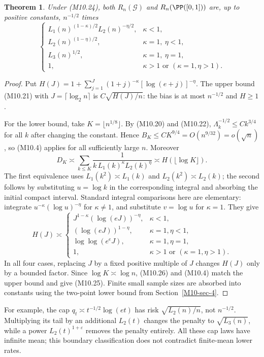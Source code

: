 \documentclass[11pt,a4paper]{article}
\newtheorem{theorem}{Theorem}[section]
\theoremstyle{definition}\newtheorem{definition}[theorem]{Definition}
\theoremstyle{remark}\newtheorem{remark}[theorem]{Remark}
\numberwithin{equation}{section}
\begin{document}
\begin{theorem}\label{M10-th:logs}
Under (M10.24), both $R_n(\mathcal G)$ and $R_n(\PP([0,1]))$ are, up to positive constants, $n^{-1/2}$ times
\[
 \begin{cases}
 L_1(n)^{(1-\kappa)/2}L_2(n)^{-\eta/2},&\kappa<1,\\
 L_2(n)^{(1-\eta)/2},&\kappa=1,\ \eta<1,\\
 L_3(n)^{1/2},&\kappa=1,\ \eta=1,\\
 1,&\kappa>1\text{ or }(\kappa=1,\eta>1).
 \end{cases}\tag{M10.25}
\]
\end{theorem}
\begin{proof}
Put $H(J)=1+\sum_{j=1}^J(1+j)^{-\kappa}[\log(e+j)]^{-\eta}$. The upper bound (M10.21) with $J=\lceil\log_2n\rceil$ is $C\sqrt{H(J)/n}$: the bias is at most $n^{-1/2}$ and $H\ge1$.

For the lower bound, take $K=\lfloor n^{1/8}\rfloor$. By (M10.20) and (M10.22), $\Lambda_k^{-1/2}\le Ck^{3/4}$ for all $k$ after changing the constant. Hence $B_K\le C K^{9/4}=O(n^{9/32})=o(\sqrt n)$, so (M10.4) applies for all sufficiently large $n$. Moreover
\[
 D_K\asymp\sum_{k\le K}
 \frac1{k\,L_1(k)^\kappa L_2(k)^\eta}
 \asymp H(\lfloor\log K\rfloor).\tag{M10.26}
\]
The first equivalence uses $L_1(k^2)\asymp L_1(k)$ and $L_2(k^2)\asymp L_2(k)$; the second follows by substituting $u=\log k$ in the corresponding integral and absorbing the initial compact interval. Standard integral comparisons here are elementary: integrate $u^{-\kappa}(\log u)^{-\eta}$ for $\kappa\ne1$, and substitute $v=\log u$ for $\kappa=1$. They give
\[
 H(J)\asymp
 \begin{cases}
 J^{1-\kappa}(\log(eJ))^{-\eta},&\kappa<1,\\
 (\log(eJ))^{1-\eta},&\kappa=1,\eta<1,\\
 \log\log(e^eJ),&\kappa=1,\eta=1,\\
 1,&\kappa>1\text{ or }(\kappa=1,\eta>1).
 \end{cases}
\]
In all four cases, replacing $J$ by a fixed positive multiple of $J$ changes $H(J)$ only by a bounded factor. Since $\log K\asymp\log n$, (M10.26) and (M10.4) match the upper bound and give (M10.25). Finite small sample sizes are absorbed into constants using the two-point lower bound from Section~\ref{M10-sec-4}.
\end{proof}
For example, the cap $q_t\asymp t^{-1/2}\log(et)$ has risk $\sqrt{L_2(n)/n}$, not $n^{-1/2}$. Multiplying its tail by an additional $L_2(t)$ changes the penalty to $\sqrt{L_3(n)}$, while a power $L_2(t)^{1+\varepsilon}$ removes the penalty entirely. All these cap laws have infinite mean; this boundary classification does not contradict finite-mean lower rates.
\end{document}
